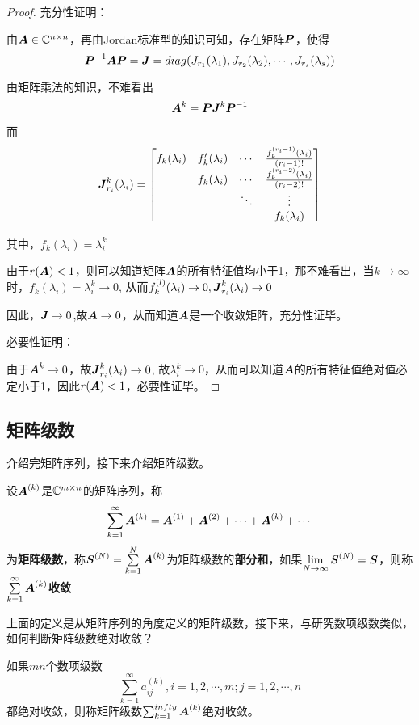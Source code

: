 \documentclass[12pt, a4paper, oneside, UTF8]{ctexbook}
\begin{document}
\begin{proof}
    
    充分性证明：

    由$\A\in\C^{n\times n}$，再由Jordan标准型的知识可知，存在矩阵$\P$，使得\[\P^{-1}\A\P=\J=diag(J_{r_1}(\lambda_1),J_{r_2}(\lambda_2),\cdots,J_{r_s}(\lambda_s) )\]
    
    由矩阵乘法的知识，不难看出\[\A^k=\P\J^k\P^{-1}\]

    而\[\J_{r_i}^k(\lambda_i)=\begin{bmatrix}
        f_k(\lambda_i)&f'_k(\lambda_i)&\cdots&\frac{f^{(r_i-1)}_k(\lambda_i)}{(r_i-1)!}\\
        &f_k(\lambda_i)&\cdots&\frac{f^{(r_i-2)}_k(\lambda_i)}{(r_i-2)!}\\
        &&\ddots&\vdots\\
        &&&f_k(\lambda_i)
    \end{bmatrix}\]

    其中，$f_k(\lambda_i)=\lambda_i^k$

    由于$r(\A)<1$，则可以知道矩阵$\A$的所有特征值均小于1，那不难看出，当$k\to\infty$时，$f_k(\lambda_i)=\lambda_i^k\to0$, 从而$f_k^{(l)}(\lambda_i)\to0, \J_{r_i}^k(\lambda_i)\to0$

    因此，$\J\to0$,故$\A\to0$，从而知道$\A$是一个收敛矩阵，充分性证毕。

    必要性证明：

    由于$\A^k\to0$，故$\J_{r_i}^k(\lambda_i)\to0$, 故$\lambda_i^k\to 0$，从而可以知道$\A$的所有特征值绝对值必定小于1，因此$r(\A)<1$，必要性证毕。
\end{proof}
\subsection{矩阵级数}
介绍完矩阵序列，接下来介绍矩阵级数。

\begin{defn}{}{}
    设$\A^{(k)}$是$\C^{m\times n}$的矩阵序列，称\[\sum_{k=1}^{\infty}\A^{(k)}=\A^{(1)}+\A^{(2)}+\cdots+\A^{(k)}+\cdots\]为\textbf{矩阵级数}，称$\bs{S}^{(N)}=\sum\limits_{k=1}^{N}\A^{(k)}$为矩阵级数的\textbf{部分和}，如果$\lim\limits_{N\to\infty}\bs{S}^{(N)}=\bs{S}$，则称$\sum\limits_{k=1}^{\infty}\A^{(k)}$\textbf{收敛}
\end{defn}

上面的定义是从矩阵序列的角度定义的矩阵级数，接下来，与研究数项级数类似，如何判断矩阵级数绝对收敛？
\begin{defn}{}{}
    如果$mn$个数项级数
    \[\sum_{k=1}^{\infty}a_{ij}^{(k)},i=1,2,\cdots,m;j=1,2,\cdots,n\]都绝对收敛，则称矩阵级数$\sum_{k=1}^{infty}\A^{(k)}$绝对收敛。
\end{defn}
\end{document}
